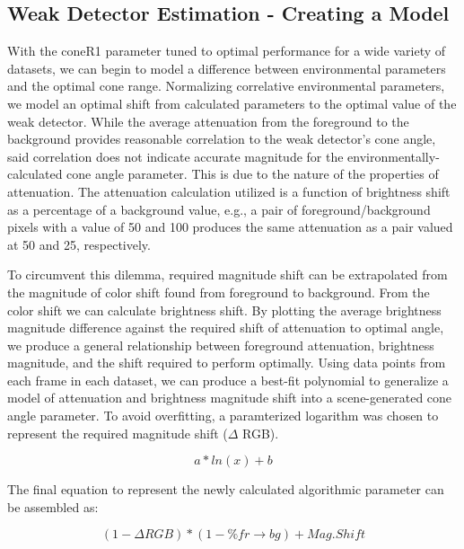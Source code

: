 \documentclass[12pt]{report}
\begin{document}
\subsection{Weak Detector Estimation - Creating a Model}

With the coneR1 parameter tuned to optimal performance for a wide variety of datasets, we can begin to model a difference between environmental parameters and the optimal cone range. Normalizing correlative environmental parameters, we model an optimal shift from calculated parameters to the optimal value of the weak detector. While the average attenuation from the foreground to the background provides reasonable correlation to the weak detector's cone angle, said correlation does not indicate accurate magnitude for the environmentally-calculated cone angle parameter. This is due to the nature of the properties of attenuation. The attenuation calculation utilized is a function of brightness shift as a percentage of a background value, e.g., a pair of foreground/background pixels with a value of 50 and 100 produces the same attenuation as a pair valued at 50 and 25, respectively.

To circumvent this dilemma, required magnitude shift can be extrapolated from the magnitude of color shift found from foreground to background. From the color shift we can calculate brightness shift. By plotting the average brightness magnitude difference against the required shift of attenuation to optimal angle, we produce a general relationship between foreground attenuation, brightness magnitude, and the shift required to perform optimally. Using data points from each frame in each dataset, we can produce a best-fit polynomial to generalize a model of attenuation and brightness magnitude shift into a scene-generated cone angle parameter. To avoid overfitting, a paramterized logarithm was chosen to represent the required magnitude shift ($\Delta$ RGB).

\begin{equation}
a*ln(x) + b
\end{equation}

The final equation to represent the newly calculated algorithmic parameter can be assembled as:

\begin{equation}
(1 - \Delta RGB)*(1 - \%fr \rightarrow bg) + Mag. Shift
\end{equation}
\end{document}

